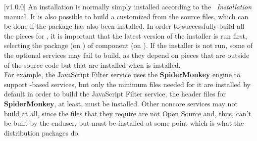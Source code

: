 [v1.0.0]
An \mplusm{} installation is normally simply installed according to the
\emph{\MMM{}~Installation} manual.
It is also possible to build a customized \mplusm{} from the source files, which can be
done if the  package has also been installed.
In order to successfully build all the pieces for \mplusm{}, it is important that the
latest version of the installer is run first, selecting the  package (on
\osx) of  component (on \win).
If the installer is not run, some of the optional services may fail to build, as they
depend on pieces that are outside of the \mplusm{} source code but that are installed when
\mplusm{} is installed.\\

For example, the JavaScript Filter service uses the \textbf{SpiderMonkey} engine to
support -based services, but only the minimum files needed for it are
installed by default \longDash{} in order to build the JavaScript Filter service, the
header files for \textbf{SpiderMonkey}, at least, must be installed.
Other non\longDash{}core services may not build at all, since the files that they require
are not Open Source and, thus, can't be built by the end\longDash{}user, but must be
installed at some point \longDash{} which is what the distribution packages do.\\

